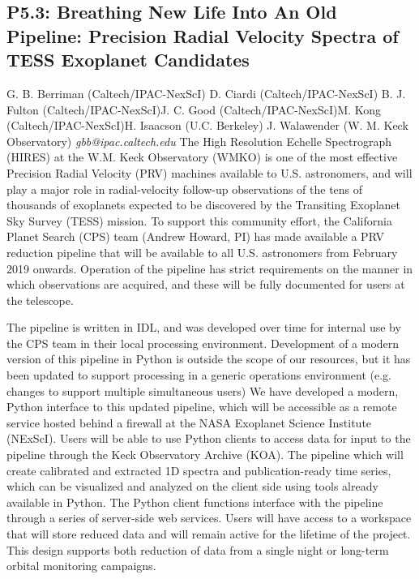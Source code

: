 \documentclass{report}
\begin{document}
\subsection*{P5.3: Breathing New Life Into An Old Pipeline: Precision Radial Velocity Spectra of TESS Exoplanet Candidates}
\bigskip
G. B. Berriman (Caltech/IPAC-NexScI) \newline D. Ciardi (Caltech/IPAC-NexScI) \newline  B. J. Fulton (Caltech/IPAC-NexScI)\newline  J. C. Good (Caltech/IPAC-NexScI)\newline M. Kong (Caltech/IPAC-NexScI)\newline  H. Isaacson (U.C. Berkeley)
J. Walawender (W. M. Keck Observatory)\newline\newline
{\it gbb@ipac.caltech.edu}\newline
\newline\newline
The High Resolution Echelle Spectrograph (HIRES) at the W.M. Keck Observatory (WMKO) is one of the most effective Precision Radial Velocity (PRV) machines available to U.S. astronomers, and will play a major role in radial-velocity follow-up observations of the tens of thousands of exoplanets expected to be discovered by the Transiting Exoplanet Sky Survey (TESS) mission.  To support this community effort, the California Planet Search (CPS) team (Andrew Howard, PI) has made available a PRV reduction pipeline that will be available to all U.S. astronomers from February 2019 onwards. Operation of the pipeline has strict requirements on the manner in which observations are acquired, and these will be fully documented for users at the telescope.

The pipeline is written in IDL, and was developed over time for internal use by the CPS team in their local processing environment. Development of a modern version of this pipeline in Python is outside the scope of our resources, but it has been updated to support processing in a generic operations environment (e.g. changes to support multiple simultaneous users) We have developed a modern, Python interface to this updated pipeline, which will be accessible as a remote service hosted behind a firewall at the NASA Exoplanet Science Institute (NExScI).  Users will be able to use Python clients to access data for input to the pipeline through the Keck Observatory Archive (KOA). The pipeline which will create calibrated and extracted 1D spectra and publication-ready time series, which can be visualized and analyzed on the client side using tools already available in Python.   The Python client functions interface with the pipeline through a series of server-side web services. Users will have access to a workspace that will store reduced data and will remain active for the lifetime of the project. This design supports both reduction of data from a single night or long-term orbital monitoring campaigns.
\end{document}
